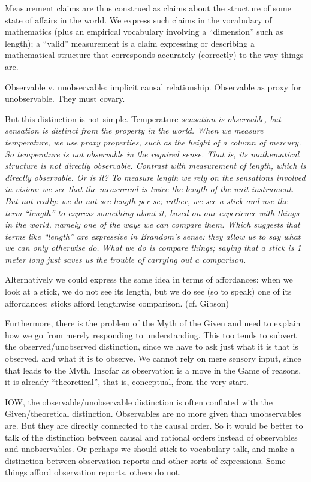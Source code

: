 \documentclass[11pt,twoside]{article}
\begin{document}
Measurement claims are thus construed as claims about the structure of
some state of affairs in the world.  We express such claims in the
vocabulary of mathematics (plus an empirical vocabulary involving a
``dimension'' such as length); a ``valid'' measurement is a claim
expressing or describing a mathematical structure that corresponds
accurately (correctly) to the way things are.

Observable v. unobservable: implicit causal relationship.  Observable
as proxy for unobservable.  They must covary.

But this distinction is not simple.  Temperature \it{sensation} is
observable, but sensation is distinct from the property in the world.
When we measure temperature, we use proxy properties, such as the
height of a column of mercury.  So temperature is not observable in
the required sense.  That is, its mathematical structure is not
directly observable.  Contrast with measurement of length, which is
directly observable.  Or is it?  To measure length we rely on the
sensations involved in vision: we see that the measurand is twice the
length of the unit instrument.  But not really: we do not \it{see}
length per se; rather, we see a stick and use the term ``length'' to
express something about it, based on our experience with things in the
world, namely one of the ways we can compare them.  Which suggests
that terms like ``length'' are expressive in Brandom's sense: they
allow us to say what we can only otherwise do.  What we do is compare
things; saying that a stick is 1 meter long just saves us the trouble
of carrying out a comparison.

Alternatively we could express the same idea in terms of affordances:
when we look at a stick, we do not see its length, but we do see (so
to speak) one of its affordances: sticks afford lengthwise
comparison. (cf. Gibson)

Furthermore, there is the problem of the Myth of the Given and need to
explain how we go from merely responding to understanding.  This too
tends to subvert the observed/unobserved distinction, since we have to
ask just what it is that is observed, and what it is to observe.  We
cannot rely on mere sensory input, since that leads to the Myth.
Insofar as observation is a move in the Game of reasons, it is already
``theoretical'', that is, conceptual, from the very start.

IOW, the observable/unobservable distinction is often conflated with
the Given/theoretical distinction.  Observables are no more given than
unobservables are.  But they are directly connected to the causal
order.  So it would be better to talk of the distinction between
causal and rational orders instead of observables and unobservables.
Or perhaps we should stick to vocabulary talk, and make a distinction
between observation reports and other sorts of expressions.  Some
things afford observation reports, others do not.
\end{document}
